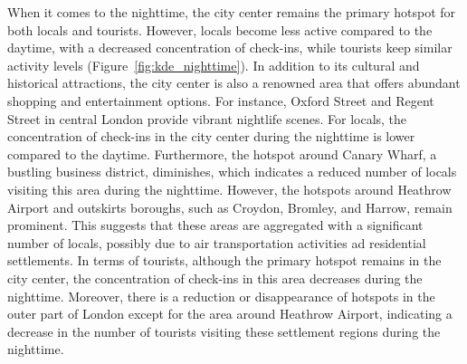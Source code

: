 \documentclass{article}
\theoremstyle{definition}
\theoremstyle{remark}
\begin{document}
When it comes to the nighttime, the city center remains the primary hotspot for both locals and tourists. However, locals become less active compared to the daytime, with a decreased concentration of check-ins, while tourists keep similar activity levels (Figure~\ref{fig:kde_nighttime}). In addition to its cultural and historical attractions, the city center is also a renowned area that offers abundant shopping and entertainment options. For instance, Oxford Street and Regent Street in central London provide vibrant nightlife scenes. For locals, the concentration of check-ins in the city center during the nighttime is lower compared to the daytime. Furthermore, the hotspot around Canary Wharf, a bustling business district, diminishes, which indicates a reduced number of locals visiting this area during the nighttime. However, the hotspots around Heathrow Airport and outskirts boroughs, such as Croydon, Bromley, and Harrow, remain prominent. This suggests that these areas are aggregated with a significant number of locals, possibly due to air transportation activities ad residential settlements. In terms of tourists, although the primary hotspot remains in the city center, the concentration of check-ins in this area decreases during the nighttime. Moreover, there is a reduction or disappearance of hotspots in the outer part of London except for the area around Heathrow Airport, indicating a decrease in the number of tourists visiting these settlement regions during the nighttime.
\end{document}
